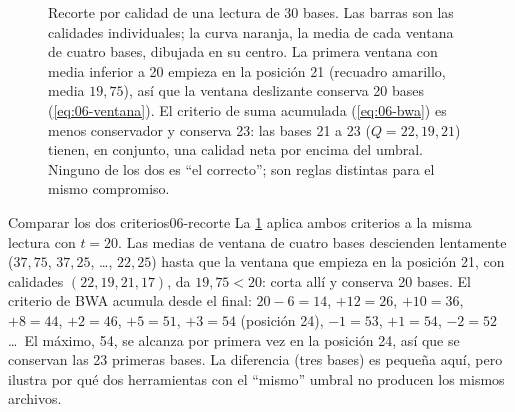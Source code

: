 \begin{figure}[t]
\centering

\caption[Recorte por calidad]{Recorte por calidad de una lectura de 30 bases. Las barras son las calidades individuales; la curva naranja, la media de cada ventana de cuatro bases, dibujada en su centro. La primera ventana con media inferior a 20 empieza en la posición 21 (recuadro amarillo, media $19{,}75$), así que la ventana deslizante conserva 20 bases (\cref{eq:06-ventana}). El criterio de suma acumulada (\cref{eq:06-bwa}) es menos conservador y conserva 23: las bases 21 a 23 ($Q=22,19,21$) tienen, en conjunto, una calidad neta por encima del umbral. Ninguno de los dos es ``el correcto''; son reglas distintas para el mismo compromiso.}
\label{fig:06-ventana}
\end{figure}

\begin{ejemplo}{Comparar los dos criterios}{06-recorte}
La \cref{fig:06-ventana} aplica ambos criterios a la misma lectura con $t=20$. Las medias de ventana de cuatro bases descienden lentamente ($37{,}75$, $37{,}25$, \ldots, $22{,}25$) hasta que la ventana que empieza en la posición 21, con calidades $(22,19,21,17)$, da $19{,}75<20$:  corta allí y conserva 20 bases. El criterio de BWA acumula desde el final: $20-6=14$, $+12=26$, $+10=36$, $+8=44$, $+2=46$, $+5=51$, $+3=54$ (posición 24), $-1=53$, $+1=54$, $-2=52$\ldots\ El máximo, 54, se alcanza por primera vez en la posición 24, así que se conservan las 23 primeras bases. La diferencia (tres bases) es pequeña aquí, pero ilustra por qué dos herramientas con el ``mismo'' umbral no producen los mismos archivos.
\end{ejemplo}

